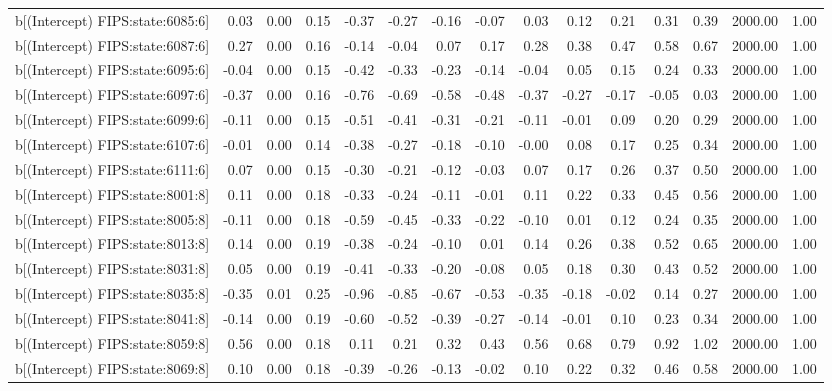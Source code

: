 \begin{table}[ht]
\begin{tabular}{rrrrrrrrrrrrrrr}
  b[(Intercept) FIPS:state:6085:6] & 0.03 & 0.00 & 0.15 & -0.37 & -0.27 & -0.16 & -0.07 & 0.03 & 0.12 & 0.21 & 0.31 & 0.39 & 2000.00 & 1.00 \\ 
  b[(Intercept) FIPS:state:6087:6] & 0.27 & 0.00 & 0.16 & -0.14 & -0.04 & 0.07 & 0.17 & 0.28 & 0.38 & 0.47 & 0.58 & 0.67 & 2000.00 & 1.00 \\ 
  b[(Intercept) FIPS:state:6095:6] & -0.04 & 0.00 & 0.15 & -0.42 & -0.33 & -0.23 & -0.14 & -0.04 & 0.05 & 0.15 & 0.24 & 0.33 & 2000.00 & 1.00 \\ 
  b[(Intercept) FIPS:state:6097:6] & -0.37 & 0.00 & 0.16 & -0.76 & -0.69 & -0.58 & -0.48 & -0.37 & -0.27 & -0.17 & -0.05 & 0.03 & 2000.00 & 1.00 \\ 
  b[(Intercept) FIPS:state:6099:6] & -0.11 & 0.00 & 0.15 & -0.51 & -0.41 & -0.31 & -0.21 & -0.11 & -0.01 & 0.09 & 0.20 & 0.29 & 2000.00 & 1.00 \\ 
  b[(Intercept) FIPS:state:6107:6] & -0.01 & 0.00 & 0.14 & -0.38 & -0.27 & -0.18 & -0.10 & -0.00 & 0.08 & 0.17 & 0.25 & 0.34 & 2000.00 & 1.00 \\ 
  b[(Intercept) FIPS:state:6111:6] & 0.07 & 0.00 & 0.15 & -0.30 & -0.21 & -0.12 & -0.03 & 0.07 & 0.17 & 0.26 & 0.37 & 0.50 & 2000.00 & 1.00 \\ 
  b[(Intercept) FIPS:state:8001:8] & 0.11 & 0.00 & 0.18 & -0.33 & -0.24 & -0.11 & -0.01 & 0.11 & 0.22 & 0.33 & 0.45 & 0.56 & 2000.00 & 1.00 \\ 
  b[(Intercept) FIPS:state:8005:8] & -0.11 & 0.00 & 0.18 & -0.59 & -0.45 & -0.33 & -0.22 & -0.10 & 0.01 & 0.12 & 0.24 & 0.35 & 2000.00 & 1.00 \\ 
  b[(Intercept) FIPS:state:8013:8] & 0.14 & 0.00 & 0.19 & -0.38 & -0.24 & -0.10 & 0.01 & 0.14 & 0.26 & 0.38 & 0.52 & 0.65 & 2000.00 & 1.00 \\ 
  b[(Intercept) FIPS:state:8031:8] & 0.05 & 0.00 & 0.19 & -0.41 & -0.33 & -0.20 & -0.08 & 0.05 & 0.18 & 0.30 & 0.43 & 0.52 & 2000.00 & 1.00 \\ 
  b[(Intercept) FIPS:state:8035:8] & -0.35 & 0.01 & 0.25 & -0.96 & -0.85 & -0.67 & -0.53 & -0.35 & -0.18 & -0.02 & 0.14 & 0.27 & 2000.00 & 1.00 \\ 
  b[(Intercept) FIPS:state:8041:8] & -0.14 & 0.00 & 0.19 & -0.60 & -0.52 & -0.39 & -0.27 & -0.14 & -0.01 & 0.10 & 0.23 & 0.34 & 2000.00 & 1.00 \\ 
  b[(Intercept) FIPS:state:8059:8] & 0.56 & 0.00 & 0.18 & 0.11 & 0.21 & 0.32 & 0.43 & 0.56 & 0.68 & 0.79 & 0.92 & 1.02 & 2000.00 & 1.00 \\ 
  b[(Intercept) FIPS:state:8069:8] & 0.10 & 0.00 & 0.18 & -0.39 & -0.26 & -0.13 & -0.02 & 0.10 & 0.22 & 0.32 & 0.46 & 0.58 & 2000.00 & 1.00 \\ 

\end{tabular}
\end{table}
